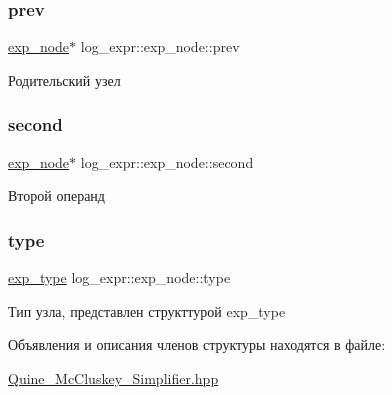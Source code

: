 \subsubsection{\texorpdfstring{prev}{prev}}
{\footnotesize\ttfamily \hyperlink{structlog__expr_1_1exp__node}{exp\+\_\+node}$\ast$ log\+\_\+expr\+::exp\+\_\+node\+::prev}

Родительский узел \mbox{\label{structlog__expr_1_1exp__node_a49c94d8b978f57e2b954a793cf69df13}} 
\subsubsection{\texorpdfstring{second}{second}}
{\footnotesize\ttfamily \hyperlink{structlog__expr_1_1exp__node}{exp\+\_\+node}$\ast$ log\+\_\+expr\+::exp\+\_\+node\+::second}

Второй операнд \mbox{\label{structlog__expr_1_1exp__node_a577ddefdceaaf43406988533be4b0b48}} 
\subsubsection{\texorpdfstring{type}{type}}
{\footnotesize\ttfamily \hyperlink{classlog__expr_abfd63d60441373c4017ef250008102d9}{exp\+\_\+type} log\+\_\+expr\+::exp\+\_\+node\+::type}

Тип узла, представлен структтурой exp\+\_\+type 

Объявления и описания членов структуры находятся в файле\+:\begin{DoxyCompactItemize}
\item 
\hyperlink{_quine___mc_cluskey___simplifier_8hpp}{Quine\+\_\+\+Mc\+Cluskey\+\_\+\+Simplifier.\+hpp}\end{DoxyCompactItemize}
